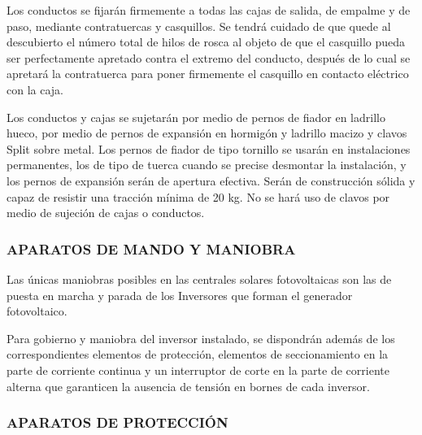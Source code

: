 \documentclass{article}
\begin{document}
Los conductos se fijarán firmemente a todas las cajas de salida, de empalme y de paso,
mediante contratuercas y casquillos. Se tendrá cuidado de que quede al descubierto el número
total de hilos de rosca al objeto de que el casquillo pueda ser perfectamente apretado contra el
extremo del conducto, después de lo cual se apretará la contratuerca para poner firmemente el
casquillo en contacto eléctrico con la caja.

Los conductos y cajas se sujetarán por medio de pernos de fiador en ladrillo hueco, por medio
de pernos de expansión en hormigón y ladrillo macizo y clavos Split sobre metal. Los pernos de
fiador de tipo tornillo se usarán en instalaciones permanentes, los de tipo de tuerca cuando se
precise desmontar la instalación, y los pernos de expansión serán de apertura efectiva. Serán
de construcción sólida y capaz de resistir una tracción mínima de 20 kg. No se hará uso de
clavos por medio de sujeción de cajas o conductos.



\subsubsection{APARATOS DE MANDO Y MANIOBRA}
Las únicas maniobras posibles en las centrales solares fotovoltaicas son las de puesta en
marcha y parada de los Inversores que forman el generador fotovoltaico.

Para gobierno y maniobra del inversor instalado, se dispondrán además de los correspondientes
elementos de protección, elementos de seccionamiento en la parte de corriente continua y un
interruptor de corte en la parte de corriente alterna que garanticen la ausencia de tensión en
bornes de cada inversor.


\subsubsection{APARATOS DE PROTECCIÓN}
\end{document}
